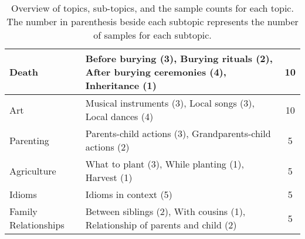 \begin{table*}[ht]
{\begin{tabular}{p{4cm} p{9cm} c}
Death                    & Before burying (3), Burying rituals (2), After burying ceremonies (4), Inheritance (1)                                                                                                                                                   & 10                 \\ \hline
Art                      & Musical instruments (3), Local songs (3), Local dances (4)                                                                                                                                                                               & 10                 \\ \hline
Parenting                & Parents-child actions (3), Grandparents-child actions (2)                                                                                                                                                                                 & 5                  \\ \hline
Agriculture              & What to plant (3), While planting (1), Harvest (1)                                                                                                                                                                                        & 5                  \\ \hline
Idioms                   & Idioms in context (5)                                                                                                                                                                                                                                & 5                  \\ \hline
Family Relationships     & Between siblings (2), With cousins (1), Relationship of parents and child (2)                                                                                                                                                            & 5                  \\ \hline
\end{tabular}
}\caption{Overview of topics, sub-topics, and the sample counts for each topic. The number in parenthesis beside each subtopic represents the number of samples for each subtopic.}
\label{tab:topics}
\end{table*}
